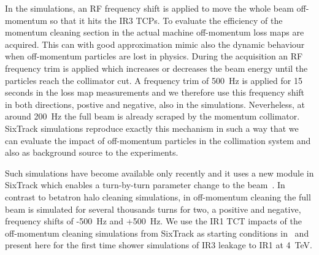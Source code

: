 In the simulations, an RF frequency shift is applied to move the whole beam off-momentum so that it hits the IR3 TCPs. To evaluate the efficiency of the momentum cleaning section in the actual machine off-momentum loss maps are acquired. This can with good approximation mimic also the dynamic behaviour when off-momentum particles are lost in physics. During the acquisition an RF frequency trim is applied which increases or decreases the beam energy until the particles reach the collimator cut. A frequency trim of 500~Hz is applied for 15 seconds in the loss map measurements and we therefore use this frequency shift in both directions, postive and negative, also in the simulations. Neverheless, at around 200~Hz the full beam is already scraped by the momentum collimator. SixTrack simulations reproduce exactly this mechanism in such a way that we can evaluate the impact of off-momentum particles in the collimation system and also as background source to the experiments.

Such simulations have become available only recently and it uses a new module in SixTrack which enables a turn-by-turn parameter change to the beam~\cite{KyrreIpac2015}. In contrast to betatron halo cleaning simulations, in off-momentum cleaning the full beam is simulated for several thousands turns for two, a positive and negative, frequency shifts of -500~Hz and +500~Hz. %
We use the IR1 TCT impacts of the off-momentum cleaning simulations from SixTrack as starting conditions in \fluka~and present here for the first time shower simulations of IR3 leakage to IR1 at 4~TeV. 


